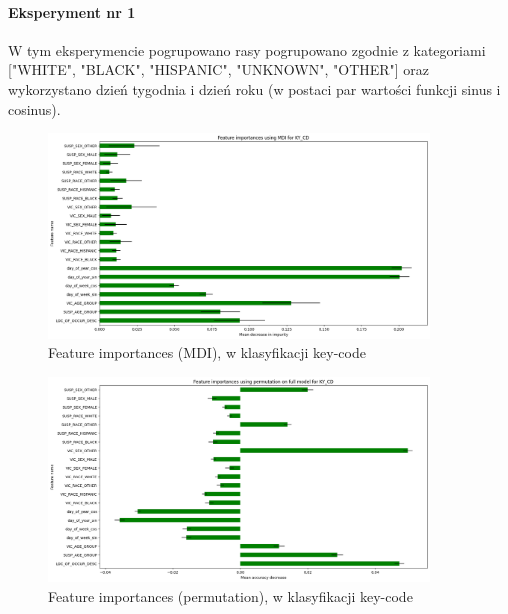 \documentclass{classrep}
\begin{document}
{{{                \paragraph{Eksperyment nr 1}{
                    W tym eksperymencie pogrupowano rasy pogrupowano zgodnie z
                    kategoriami ["WHITE", "BLACK", "HISPANIC", "UNKNOWN", "OTHER"] oraz
                    wykorzystano dzień tygodnia i dzień roku (w postaci par wartości
                    funkcji sinus i cosinus).
                    \begin{figure}[!htbp]
                        \centering
                        \includegraphics[width=0.9\textwidth]{img/5.1.3/1/Feature importances using MDI for KY_CD.png}
                        \caption{Feature importances (MDI), w klasyfikacji key-code}
                        \label{goal_1_exp_1_imp_mdi_key}
                    \end{figure}
                    
                    \begin{figure}[!htbp]
                        \centering
                        \includegraphics[width=0.9\textwidth]{img/5.1.3/1/Feature importances using permutation on full model for KY_CD.png}
                        \caption{Feature importances (permutation), w klasyfikacji key-code}
                        \label{goal_1_exp_1_imp_perm_key}
                    \end{figure}
                    
}}}}
\end{document}
